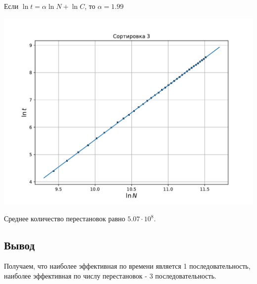 \documentclass[a4paper,12pt]{article}
\begin{document}
Если $\ln t = \alpha \ln N + \ln C$, то $\alpha = 1.99$


\begin{center}
\includegraphics[scale=0.6]{Figure_4.pdf}
\end{center}

Среднее количество перестановок равно $5.07 \cdot 10^8$.

\subsection*{Вывод}
Получаем, что наиболее эффективная по времени является 1 последовательность, наиболее эффективная по числу перестановок - 3 последовательность.
\end{document}
